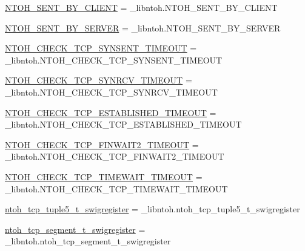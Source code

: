 \begin{DoxyCompactItemize}
\hyperlink{namespacelibntoh_ae94583b0e9c85ce2eb1539a2115e020e}{N\-T\-O\-H\-\_\-\-S\-E\-N\-T\-\_\-\-B\-Y\-\_\-\-C\-L\-I\-E\-N\-T} = \-\_\-libntoh.\-N\-T\-O\-H\-\_\-\-S\-E\-N\-T\-\_\-\-B\-Y\-\_\-\-C\-L\-I\-E\-N\-T
\item 
\hyperlink{namespacelibntoh_ae26db46e12b119d826932506949a2893}{N\-T\-O\-H\-\_\-\-S\-E\-N\-T\-\_\-\-B\-Y\-\_\-\-S\-E\-R\-V\-E\-R} = \-\_\-libntoh.\-N\-T\-O\-H\-\_\-\-S\-E\-N\-T\-\_\-\-B\-Y\-\_\-\-S\-E\-R\-V\-E\-R
\item 
\hyperlink{namespacelibntoh_abfe76673102062bcf1a43680942f52c9}{N\-T\-O\-H\-\_\-\-C\-H\-E\-C\-K\-\_\-\-T\-C\-P\-\_\-\-S\-Y\-N\-S\-E\-N\-T\-\_\-\-T\-I\-M\-E\-O\-U\-T} = \-\_\-libntoh.\-N\-T\-O\-H\-\_\-\-C\-H\-E\-C\-K\-\_\-\-T\-C\-P\-\_\-\-S\-Y\-N\-S\-E\-N\-T\-\_\-\-T\-I\-M\-E\-O\-U\-T
\item 
\hyperlink{namespacelibntoh_a414d11b286eeefe703820627e8540d36}{N\-T\-O\-H\-\_\-\-C\-H\-E\-C\-K\-\_\-\-T\-C\-P\-\_\-\-S\-Y\-N\-R\-C\-V\-\_\-\-T\-I\-M\-E\-O\-U\-T} = \-\_\-libntoh.\-N\-T\-O\-H\-\_\-\-C\-H\-E\-C\-K\-\_\-\-T\-C\-P\-\_\-\-S\-Y\-N\-R\-C\-V\-\_\-\-T\-I\-M\-E\-O\-U\-T
\item 
\hyperlink{namespacelibntoh_a7b19f331a70eb569a3fbe76ad8af7b86}{N\-T\-O\-H\-\_\-\-C\-H\-E\-C\-K\-\_\-\-T\-C\-P\-\_\-\-E\-S\-T\-A\-B\-L\-I\-S\-H\-E\-D\-\_\-\-T\-I\-M\-E\-O\-U\-T} = \-\_\-libntoh.\-N\-T\-O\-H\-\_\-\-C\-H\-E\-C\-K\-\_\-\-T\-C\-P\-\_\-\-E\-S\-T\-A\-B\-L\-I\-S\-H\-E\-D\-\_\-\-T\-I\-M\-E\-O\-U\-T
\item 
\hyperlink{namespacelibntoh_a254d8e11d72b48c5595012e856e166f0}{N\-T\-O\-H\-\_\-\-C\-H\-E\-C\-K\-\_\-\-T\-C\-P\-\_\-\-F\-I\-N\-W\-A\-I\-T2\-\_\-\-T\-I\-M\-E\-O\-U\-T} = \-\_\-libntoh.\-N\-T\-O\-H\-\_\-\-C\-H\-E\-C\-K\-\_\-\-T\-C\-P\-\_\-\-F\-I\-N\-W\-A\-I\-T2\-\_\-\-T\-I\-M\-E\-O\-U\-T
\item 
\hyperlink{namespacelibntoh_a47187341be077ae18cda06f466796914}{N\-T\-O\-H\-\_\-\-C\-H\-E\-C\-K\-\_\-\-T\-C\-P\-\_\-\-T\-I\-M\-E\-W\-A\-I\-T\-\_\-\-T\-I\-M\-E\-O\-U\-T} = \-\_\-libntoh.\-N\-T\-O\-H\-\_\-\-C\-H\-E\-C\-K\-\_\-\-T\-C\-P\-\_\-\-T\-I\-M\-E\-W\-A\-I\-T\-\_\-\-T\-I\-M\-E\-O\-U\-T
\item 
\hyperlink{namespacelibntoh_aafdbe3c6cc28b92f46fd5432cd7db218}{ntoh\-\_\-tcp\-\_\-tuple5\-\_\-t\-\_\-swigregister} = \-\_\-libntoh.\-ntoh\-\_\-tcp\-\_\-tuple5\-\_\-t\-\_\-swigregister
\item 
\hyperlink{namespacelibntoh_a8703ca636fb66a116559b74d83b51920}{ntoh\-\_\-tcp\-\_\-segment\-\_\-t\-\_\-swigregister} = \-\_\-libntoh.\-ntoh\-\_\-tcp\-\_\-segment\-\_\-t\-\_\-swigregister

\end{DoxyCompactItemize}

